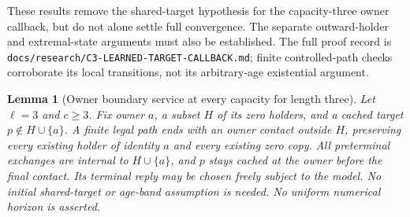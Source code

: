 \documentclass[11pt]{article}
\newtheorem{lemma}[theorem]{Lemma}
\begin{document}
These results remove the shared-target hypothesis for the
capacity-three owner callback, but do not alone settle full
convergence. The separate outward-holder and extremal-state
arguments must also be established. The full proof record is
\texttt{docs/research/C3-LEARNED-TARGET-CALLBACK.md}; finite
controlled-path checks corroborate its local transitions,
not its arbitrary-age existential argument.

\begin{lemma}[Owner boundary service at every capacity for length three]
\label{lem:threegeneralcallback}
Let $\ell=3$ and $c\ge3$. Fix owner $a$, a subset $H$ of
its zero holders, and a cached target $p\notin H\cup\{a\}$.
A finite legal path ends with an owner contact outside $H$,
preserving every existing holder of identity $a$ and every
existing zero copy. All preterminal exchanges are internal to
$H\cup\{a\}$, and $p$ stays cached at the owner before the
final contact. Its terminal reply may be chosen freely subject
to the model. No initial shared-target or age-band assumption
is needed. No uniform numerical horizon is asserted.
\end{lemma}
\end{document}
